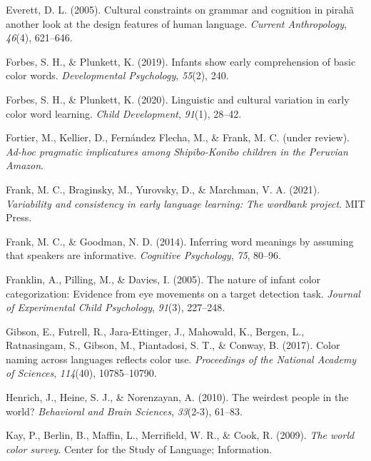 \documentclass[
  ,apa7,floatsintext]{apa6}
\newlength{\cslhangindent}
\newlength{\cslentryspacingunit} %
\newenvironment{CSLReferences}[2] %
 {%
  \setlength{\parindent}{0pt}
  \ifodd #1
  \let\oldpar\par
  \def\par{\hangindent=\cslhangindent\oldpar}
  \fi
  \setlength{\parskip}{#2\cslentryspacingunit}
 }%
 {}
\begin{document}
\begin{CSLReferences}{1}{0}
\leavevmode{}%
Everett, D. L. (2005). Cultural constraints on grammar and cognition in pirah{ã} another look at the design features of human language. \emph{Current Anthropology}, \emph{46}(4), 621--646.

\leavevmode{}%
Forbes, S. H., \& Plunkett, K. (2019). Infants show early comprehension of basic color words. \emph{Developmental Psychology}, \emph{55}(2), 240.

\leavevmode{}%
Forbes, S. H., \& Plunkett, K. (2020). Linguistic and cultural variation in early color word learning. \emph{Child Development}, \emph{91}(1), 28--42.

\leavevmode{}%
Fortier, M., Kellier, D., Fernández Flecha, M., \& Frank, M. C. (under review). \emph{Ad-hoc pragmatic implicatures among {S}hipibo-{K}onibo children in the {P}eruvian {A}mazon}.

\leavevmode{}%
Frank, M. C., Braginsky, M., Yurovsky, D., \& Marchman, V. A. (2021). \emph{Variability and consistency in early language learning: The wordbank project}. MIT Press.

\leavevmode{}%
Frank, M. C., \& Goodman, N. D. (2014). Inferring word meanings by assuming that speakers are informative. \emph{Cognitive Psychology}, \emph{75}, 80--96.

\leavevmode{}%
Franklin, A., Pilling, M., \& Davies, I. (2005). The nature of infant color categorization: Evidence from eye movements on a target detection task. \emph{Journal of Experimental Child Psychology}, \emph{91}(3), 227--248.

\leavevmode{}%
Gibson, E., Futrell, R., Jara-Ettinger, J., Mahowald, K., Bergen, L., Ratnasingam, S., Gibson, M., Piantadosi, S. T., \& Conway, B. (2017). Color naming across languages reflects color use. \emph{Proceedings of the National Academy of Sciences}, \emph{114}(40), 10785--10790.

\leavevmode{}%
Henrich, J., Heine, S. J., \& Norenzayan, A. (2010). The weirdest people in the world? \emph{Behavioral and Brain Sciences}, \emph{33}(2-3), 61--83.

\leavevmode{}%
Kay, P., Berlin, B., Maffin, L., Merrifield, W. R., \& Cook, R. (2009). \emph{The world color survey}. Center for the Study of Language; Information.


\end{CSLReferences}
\end{document}
